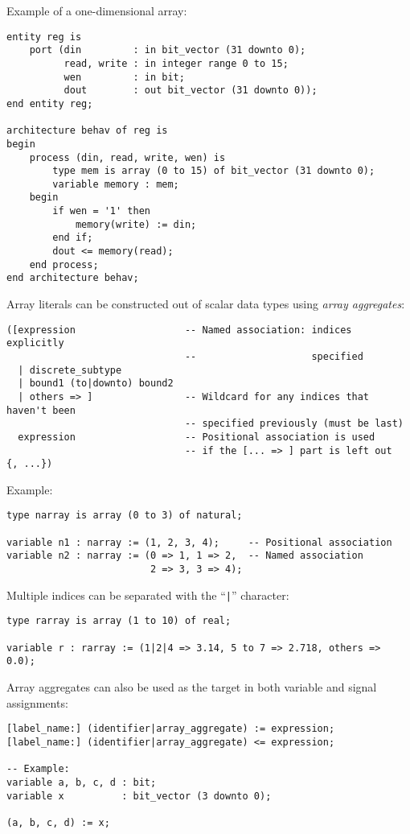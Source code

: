 \documentclass[fontsize=11pt,a4paper]{scrartcl}
\begin{document}
Example of a one-dimensional array:
\begin{lstlisting}
entity reg is
	port (din         : in bit_vector (31 downto 0);
	      read, write : in integer range 0 to 15;
	      wen         : in bit;
	      dout        : out bit_vector (31 downto 0));
end entity reg;

architecture behav of reg is
begin
	process (din, read, write, wen) is
		type mem is array (0 to 15) of bit_vector (31 downto 0);
		variable memory : mem;
	begin
		if wen = '1' then
			memory(write) := din;
		end if;
		dout <= memory(read);
	end process;
end architecture behav;
\end{lstlisting}

Array literals can be constructed out of scalar data types using \emph{array aggregates}:
\begin{lstlisting}
([expression                   -- Named association: indices explicitly
                               --                    specified
  | discrete_subtype
  | bound1 (to|downto) bound2
  | others => ]                -- Wildcard for any indices that haven't been
                               -- specified previously (must be last)
  expression                   -- Positional association is used
                               -- if the [... => ] part is left out
{, ...})
\end{lstlisting}

Example:
\begin{lstlisting}
type narray is array (0 to 3) of natural;

variable n1 : narray := (1, 2, 3, 4);     -- Positional association
variable n2 : narray := (0 => 1, 1 => 2,  -- Named association
                         2 => 3, 3 => 4);
\end{lstlisting}

Multiple indices can be separated with the ``\lstinline!|!'' character:
\begin{lstlisting}
type rarray is array (1 to 10) of real;

variable r : rarray := (1|2|4 => 3.14, 5 to 7 => 2.718, others => 0.0);
\end{lstlisting}

Array aggregates can also be used as the target in both variable and signal assignments:
\begin{lstlisting}
[label_name:] (identifier|array_aggregate) := expression;
[label_name:] (identifier|array_aggregate) <= expression;

-- Example:
variable a, b, c, d : bit;
variable x          : bit_vector (3 downto 0);

(a, b, c, d) := x;
\end{lstlisting}
\end{document}
